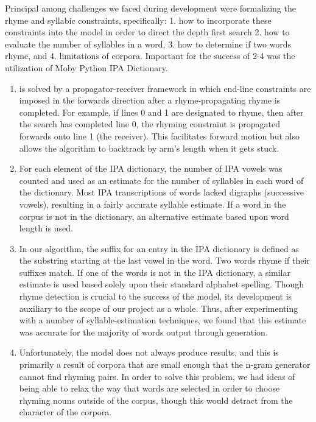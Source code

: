 \documentclass[10pt,twocolumn]{article}
\begin{document}
Principal among challenges we faced during development were formalizing the rhyme and syllabic constraints, specifically: 1. how to incorporate these constraints into the model in order to direct the depth first search 2. how to evaluate the number of syllables in a word, 3. how to determine if two words rhyme, and 4. limitations of corpora. Important for the success of 2-4 was the utilization of Moby Python IPA Dictionary. 
\begin{enumerate}
\item is solved by a propagator-receiver framework in which end-line constraints are imposed in the forwards direction after a rhyme-propagating rhyme is completed. For example, if lines 0 and 1 are designated to rhyme, then after the search has completed line 0, the rhyming constraint is propagated forwards onto line 1 (the receiver). This facilitates forward motion but also allows the algorithm to backtrack by arm's length when it gets stuck.

\item For each element of the IPA dictionary, the number of IPA vowels was counted and used as an estimate for the number of syllables in each word of the dictionary. Most IPA transcriptions of words lacked digraphs (successive vowels), resulting in a fairly accurate syllable estimate. If a word in the corpus is not in the dictionary, an alternative estimate based upon word length is used. 

\item In our algorithm, the suffix for an entry in the IPA dictionary is defined as the substring starting at the last vowel in the word. Two words rhyme if their suffixes match. If one of the words is not in the IPA dictionary, a similar estimate is used based solely upon their standard alphabet spelling. Though rhyme detection is crucial to the success of the model, its development is auxiliary to the scope of our project as a whole. Thus, after experimenting with a number of syllable-estimation techniques, we found that this estimate was accurate for the majority of words output through generation.

\item Unfortunately, the model does not always produce results, and this is primarily a result of corpora that are small enough that the n-gram generator cannot find rhyming pairs. In order to solve this problem, we had ideas of being able to relax the way that words are selected in order to choose rhyming nouns outside of the corpus, though this would detract from the character of the corpora. 
\end{enumerate}
\end{document}
